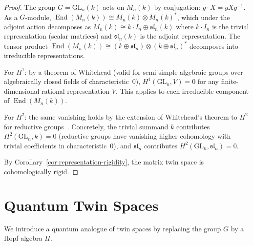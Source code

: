 \documentclass[11pt,a4paper,openany]{book}
\theoremstyle{plain}
\theoremstyle{definition}
\newcommand{\groupG}{G}
\newcommand{\GL}{\mathrm{GL}}
\DeclareMathOperator{\End}{End}
\begin{document}
\begin{proof}
The group $\groupG = \GL_n(k)$ acts on $M_n(k)$ by conjugation: $g \cdot X = gXg^{-1}$. As a $\groupG$-module, $\End(M_n(k)) \cong M_n(k) \otimes M_n(k)^*$, which under the adjoint action decomposes as $M_n(k) \cong k \cdot I_n \oplus \mathfrak{sl}_n(k)$ where $k \cdot I_n$ is the trivial representation (scalar matrices) and $\mathfrak{sl}_n(k)$ is the adjoint representation. The tensor product $\End(M_n(k)) \cong (k \oplus \mathfrak{sl}_n) \otimes (k \oplus \mathfrak{sl}_n)^*$ decomposes into irreducible representations.

For $H^1$: by a theorem of Whitehead (valid for semi-simple algebraic groups over algebraically closed fields of characteristic~0), $H^1(\GL_n, V) = 0$ for any finite-dimensional rational representation $V$. This applies to each irreducible component of $\End(M_n(k))$.

For $H^2$: the same vanishing holds by the extension of Whitehead's theorem to $H^2$ for reductive groups~\cite{jantzen2003}. Concretely, the trivial summand $k$ contributes $H^2(\GL_n, k) = 0$ (reductive groups have vanishing higher cohomology with trivial coefficients in characteristic~0), and $\mathfrak{sl}_n$ contributes $H^2(\GL_n, \mathfrak{sl}_n) = 0$.

By Corollary~\ref{cor:representation-rigidity}, the matrix twin space is cohomologically rigid.
\end{proof}

\section{Quantum Twin Spaces}\label{sec:quantum-twin}

We introduce a quantum analogue of twin spaces by replacing the group $\groupG$ by a Hopf algebra $H$.
\end{document}
